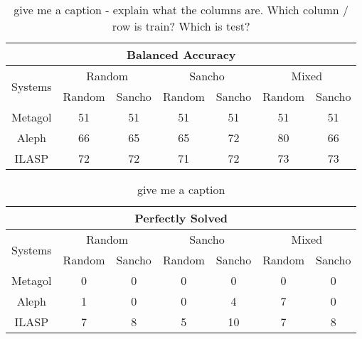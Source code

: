 \begin{table}[]
	\begin{tabular}{|c|c|c|c|c|c|c|}
		\hline
		\multicolumn{7}{|c|}{Balanced Accuracy}                                                                           \\ \hline
		\multirow{2}{*}{Systems} & \multicolumn{2}{c|}{Random} & \multicolumn{2}{c|}{Sancho} & \multicolumn{2}{c|}{Mixed} \\ \cline{2-7}
		& Random       & Sancho       & Random       & Sancho       & Random       & Sancho      \\ \hline
		Metagol                  & 51           & 51           & 51           & 51           & 51           & 51          \\ \hline
		Aleph                    & 66           & 65           & 65           & 72           & 80           & 66          \\ \hline
		ILASP                    & 72           & 72           & 71           & 72           & 73           & 73          \\ \hline
	\end{tabular}
	\label{givemeaname}
	\caption{\ac{give me a caption - explain what the columns are. Which column / row is train? Which is test?}}
\end{table}


\begin{table}[]
	\begin{tabular}{|c|c|c|c|c|c|c|}
		\hline
		\multicolumn{7}{|c|}{Perfectly Solved}                                                                            \\ \hline
		\multirow{2}{*}{Systems} & \multicolumn{2}{c|}{Random} & \multicolumn{2}{c|}{Sancho} & \multicolumn{2}{c|}{Mixed} \\ \cline{2-7}
		& Random       & Sancho       & Random       & Sancho       & Random       & Sancho      \\ \hline
		Metagol                  & 0            & 0            & 0            & 0            & 0            & 0           \\ \hline
		Aleph                    & 1            & 0            & 0            & 4            & 7            & 0           \\ \hline
		ILASP                    & 7            & 8            & 5            & 10           & 7            & 8           \\ \hline
	\end{tabular}
	\label{givemeaname}
	\caption{\ac{give me a caption}}
\end{table}

